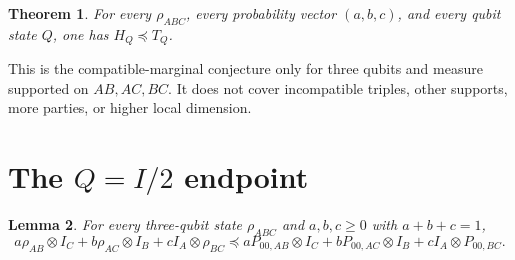 \documentclass[11pt]{article}
\newtheorem{theorem}{Theorem}
\newtheorem{lemma}[theorem]{Lemma}
\begin{document}
\begin{theorem}
For every \(\rho_{ABC}\), every probability vector \((a,b,c)\), and every
qubit state \(Q\), one has \(H_Q\preceq T_Q\).
\end{theorem}

This is the compatible-marginal conjecture only for three qubits and measure
supported on \(AB,AC,BC\).  It does not cover incompatible triples, other
supports, more parties, or higher local dimension.

\section{The \(Q=I/2\) endpoint}

\begin{lemma}\label{lem:endpoint}
For every three-qubit state \(\rho_{ABC}\) and \(a,b,c\ge0\) with
\(a+b+c=1\),
\[
a\rho_{AB}\otimes I_C+b\rho_{AC}\otimes I_B+cI_A\otimes\rho_{BC}
\preceq
aP_{00,AB}\otimes I_C+bP_{00,AC}\otimes I_B+cI_A\otimes P_{00,BC}.
\tag{1}
\]
\end{lemma}
\end{document}
